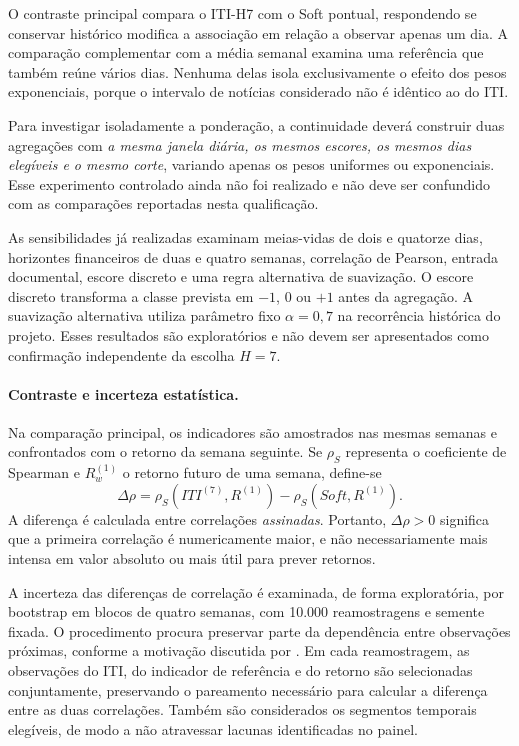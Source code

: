 O contraste principal compara o ITI-H7 com o Soft pontual, respondendo se conservar histórico modifica a associação em relação a observar apenas um dia. A comparação complementar com a média semanal examina uma referência que também reúne vários dias. Nenhuma delas isola exclusivamente o efeito dos pesos exponenciais, porque o intervalo de notícias considerado não é idêntico ao do ITI.

Para investigar isoladamente a ponderação, a continuidade deverá construir duas agregações com \emph{a mesma janela diária, os mesmos escores, os mesmos dias elegíveis e o mesmo corte}, variando apenas os pesos uniformes ou exponenciais. Esse experimento controlado ainda não foi realizado e não deve ser confundido com as comparações reportadas nesta qualificação.

As sensibilidades já realizadas examinam meias-vidas de dois e quatorze dias, horizontes financeiros de duas e quatro semanas, correlação de Pearson, entrada documental, escore discreto e uma regra alternativa de suavização. O escore discreto transforma a classe prevista em $-1$, $0$ ou $+1$ antes da agregação. A suavização alternativa utiliza parâmetro fixo $\alpha=0{,}7$ na recorrência histórica do projeto. Esses resultados são exploratórios e não devem ser apresentados como confirmação independente da escolha $H=7$.

\paragraph{Contraste e incerteza estatística.}
Na comparação principal, os indicadores são amostrados nas mesmas semanas e confrontados com o retorno da semana seguinte. Se $\rho_S$ representa o coeficiente de Spearman e $R_w^{(1)}$ o retorno futuro de uma semana, define-se
\begin{equation}
    \Delta\rho=\rho_S\!\left(ITI^{(7)},R^{(1)}\right)-\rho_S\!\left(Soft,R^{(1)}\right).
    \label{eq:iti-delta}
\end{equation}
A diferença é calculada entre correlações \emph{assinadas}. Portanto, $\Delta\rho>0$ significa que a primeira correlação é numericamente maior, e não necessariamente mais intensa em valor absoluto ou mais útil para prever retornos.

A incerteza das diferenças de correlação é examinada, de forma exploratória, por bootstrap em blocos de quatro semanas, com 10.000 reamostragens e semente fixada. O procedimento procura preservar parte da dependência entre observações próximas, conforme a motivação discutida por . Em cada reamostragem, as observações do ITI, do indicador de referência e do retorno são selecionadas conjuntamente, preservando o pareamento necessário para calcular a diferença entre as duas correlações. Também são considerados os segmentos temporais elegíveis, de modo a não atravessar lacunas identificadas no painel.

